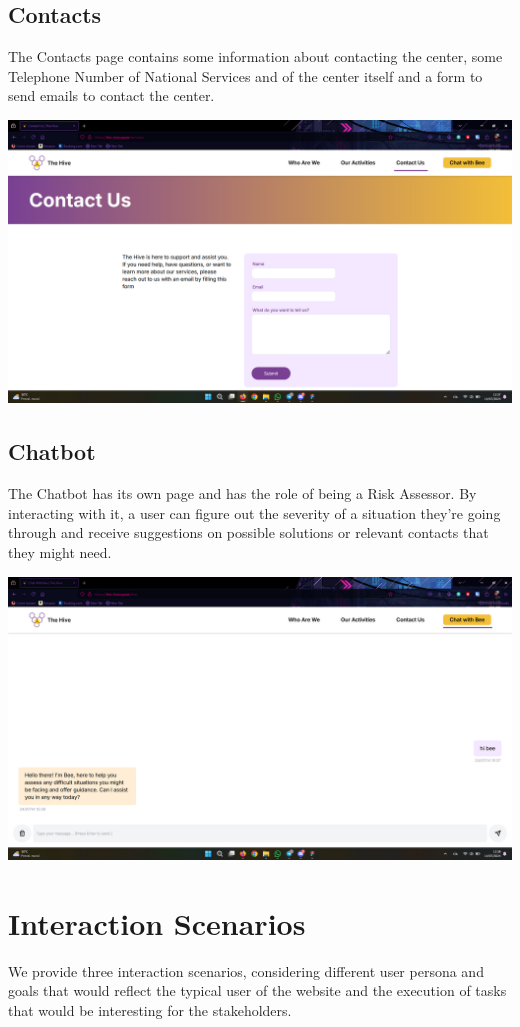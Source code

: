 \subsection{Contacts}
The Contacts page contains some information about contacting the center, some Telephone Number of National Services and of the center itself and a
form to send emails to contact the center.
\vspace{1em}
\begin{center}
    \includegraphics[width=0.5\linewidth]{img/design-document/website-screenshots/contacts.png}
\end{center}

\subsection{Chatbot}
The Chatbot has its own page and has the role of being a Risk Assessor. By interacting with it, a user can figure out the severity
of a situation they're going through and receive suggestions on possible solutions or relevant contacts that they might need.
\vspace{1em}
\begin{center}
    \includegraphics[width=0.5\linewidth]{img/design-document/website-screenshots/chatbot.png}
\end{center}


\pagebreak
\section{Interaction Scenarios}
We provide three interaction scenarios, considering different user persona and goals that would reflect
the typical user of the website and the execution of tasks that would be interesting for the stakeholders.


